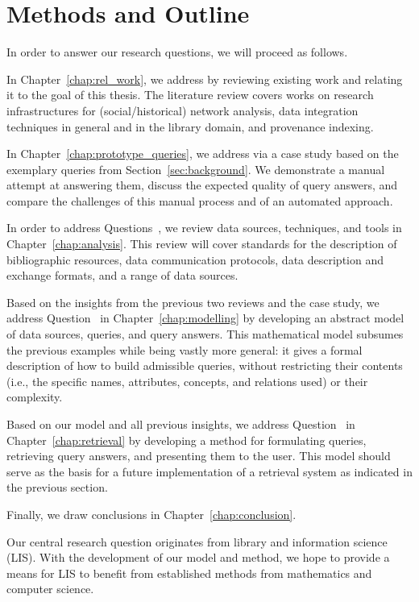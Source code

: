\section{Methods and Outline}
\label{sec:methods}

In order to answer our research questions, we will proceed as follows.

In Chapter~\ref{chap:rel_work}, we address  by reviewing existing work 
and relating it to the goal of this thesis.
The literature review covers works on research infrastructures
for (social/historical) network analysis,
data integration techniques in general and in the library domain,
and provenance indexing.

In Chapter~\ref{chap:prototype_queries}, we address 
via a case study based on the exemplary queries from Section~\ref{sec:background}.
We demonstrate a manual attempt at answering them,
discuss the expected quality of query answers,
and compare the challenges of this manual process and of an automated approach.

In order to address Questions~, we review
data sources, techniques, and tools in Chapter~\ref{chap:analysis}.
This review will cover standards for the description of bibliographic resources,
data communication protocols, data description and exchange formats,
and a range of data sources.

Based on the insights from the previous two reviews and the case study,
we address Question~ in Chapter~\ref{chap:modelling} by
developing an abstract model of
data sources, queries, and query answers.
This mathematical model subsumes the previous examples
while being vastly more general: it gives a formal description of how to
build admissible queries, without restricting their contents
(i.e., the specific names, attributes, concepts, and relations used)
or their complexity. 

Based on our model and all previous insights,
we address Question~ in Chapter~\ref{chap:retrieval} by
developing a method for formulating queries, retrieving query answers,
and presenting them to the user.
This model should serve as the basis for a future implementation of a retrieval system
as indicated in the previous section.

Finally, we draw conclusions in Chapter~\ref{chap:conclusion}.

Our central research question originates from library and information science (LIS).
With the development of our model and method,
we hope to provide a means for LIS to benefit 
from established methods from mathematics and computer science.

